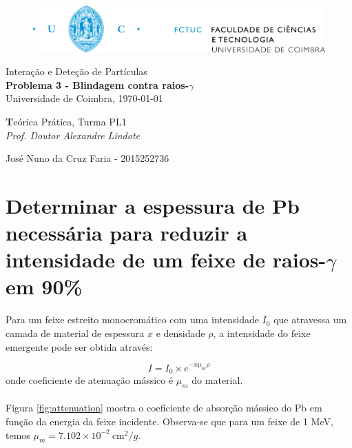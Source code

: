 \documentclass[a4paper, 12pt]{article} %
\def\classtitle{Interação e Deteção de Partículas}
\def\worktitle{Problema 3 - Blindagem contra raios-$\gamma$}
\def\profname{Doutor Alexandre Lindote}
\def\worklocal{Universidade de Coimbra}
\def\workdate{\today}
\def\authors{
	José Nuno da Cruz Faria - 2015252736
}
\def\classinfo{Teórica Prática, Turma PL1}
\begin{document}
	
	\begin{figure}[t] %
		\centering
		\includegraphics[width=0.85\linewidth]{uc_fctuc}
	\end{figure}

	\vspace*{0.05\textheight}	
	\begin{table}[!htbp]
		\centering
		
		{\Huge \classtitle}\\
		
		\vspace*{0.01\textheight}
		{\Large \textbf{\worktitle}}\\
		
		\vspace*{0.02\textheight}
		{\large {\worklocal, \workdate}}
		
	\end{table}
	
	\begin{table}[H]
		\begin{center}
			{\normalsize %
				\textbf\classinfo\\
				\emph{Prof. \profname}\\ 
				\vspace{0.0035\textheight}			
				\authors 
			}
		\end{center}
	\end{table}

	\section{Determinar a espessura de Pb necessária para reduzir a intensidade de um feixe de raios-$\gamma$ em 90\% }
	Para um feixe estreito monocromático com uma intensidade $I_0$ que atravessa um camada de material de espessura $x$ e densidade $\rho$, a intensidade do feixe emergente pode ser obtida através:

	\begin{equation}
		I = I_0 \times e^{-x\mu_m\rho}
		\label{eq:attenuation}
	\end{equation}
	onde coeficiente de atenuação mássico é $\mu_m$ do material.
	
	\paragraph{} Figura \ref{fig:attenuation} mostra o coeficiente de absorção mássico do Pb em função da energia da feixe incidente. Observa-se que para um feixe de 1 MeV, temos $\mu_m=7.102 \times 10^{-2}\ \text{cm}^2/g$.
	
\end{document}
